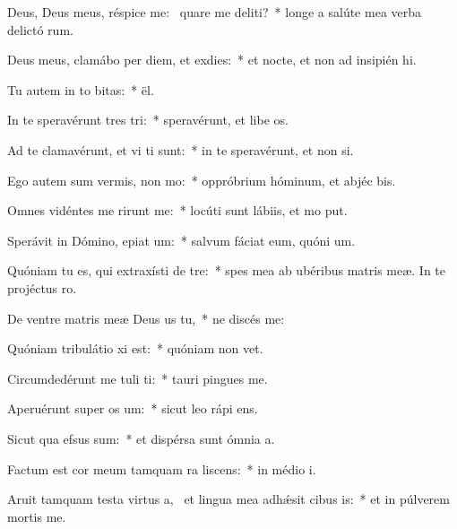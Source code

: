 \item Deus, Deus meus, réspice  me:~\pscross{} quare me deliti?~* longe a salúte mea verba delictó rum.
\item Deus meus, clamábo per diem, et  exdies:~* et nocte, et non ad insipién hi.
\item Tu autem in to bitas:~*  ël.
\item In te speravérunt tres tri:~* speravérunt, et libe os.
\item Ad te clamavérunt, et vi ti sunt:~* in te speravérunt, et non  si.
\item Ego autem sum vermis,  non mo:~* oppróbrium hóminum, et abjéc bis.
\item Omnes vidéntes me rirunt me:~* locúti sunt lábiis, et mo put.
\item Sperávit in Dómino, epiat um:~* salvum fáciat eum, quóni  um.
\item Quóniam tu es, qui extraxísti  de tre:~* spes mea ab ubéribus matris meæ. In te projéctus   ro.
\item De ventre matris meæ Deus us  tu,~* ne discés  me:
\item Quóniam tribulátio xi est:~* quóniam non   vet.
\item Circumdedérunt me tuli ti:~* tauri pingues  me.
\item Aperuérunt super  os um:~* sicut leo rápi  ens.
\item Sicut qua efsus sum:~* et dispérsa sunt ómnia  a.
\item Factum est cor meum tamquam ra liscens:~* in médio  i.
\item Aruit tamquam testa virtus a,~\pscross{} et lingua mea adhǽsit cibus is:~* et in púlverem mortis  me.
